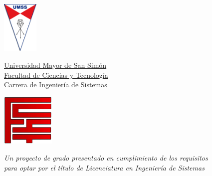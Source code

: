 \documentclass[11pt,spanish,singlespacing,headsepline]{MastersDoctoralThesis}
\author{Evelyn \textsc{Cusi López}}
\begin{document}

\frontmatter %

\pagestyle{plain} %
\begin{titlepage}

\begin{minipage}[l]{.15\linewidth}
\includegraphics[height=2.5cm]{imagenes/umss}
\end{minipage}
\begin{minipage}[c]{.65\textwidth}
\begin{center}
\href{http://www.umss.edu.bo}{\LARGE{Universidad Mayor de San Simón}} \\
\href{http://www.fcyt.umss.edu.bo}{\LARGE{Facultad de Ciencias y Tecnología}} \\
\href{http://www.cs.umss.edu.bo}{\LARGE{Carrera de Ingeniería de Sistemas}}
\end{center}
\end{minipage}
\begin{minipage}[r]{.15\linewidth}
\includegraphics[height=2.5cm]{imagenes/logo}
\end{minipage}

\vfill
\begin{center}
\Huge {\bf{\ttitle}}	
\end{center}
\singlespacing
\singlespacing
\singlespacing
\singlespacing
\singlespacing
\singlespacing
\begin{center}
{\large \textit{Un proyecto de grado presentado en cumplimiento de los requisitos\\ para optar por el t\'{i}tulo de Licenciatura en Ingenier\'{i}a de Sistemas}}
\end{center}
\vspace{\fill}


\end{titlepage}
\end{document}
